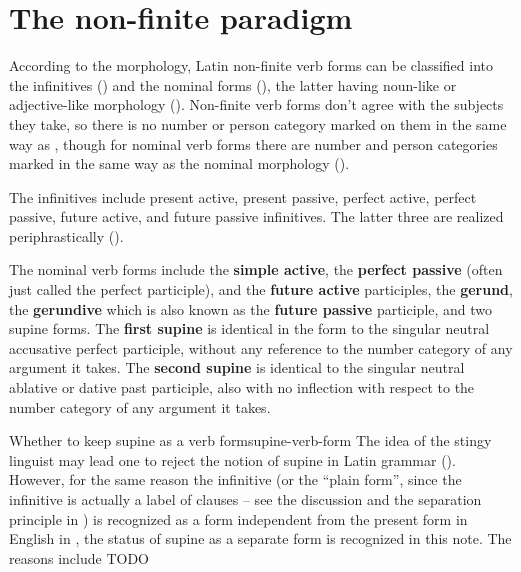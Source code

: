 \documentclass[a4paper, oneside]{report}
\newcommand*{\citepage}[1]{p.~{#1}}
\newcommand*{\concept}[1]{\textbf{#1}}
\begin{document}
\section{The non-finite paradigm}\label{sec:non-finite-abs}

According to the morphology,
Latin non-finite verb forms can be classified into the infinitives ()
and the nominal forms (),
the latter having noun-like or adjective-like morphology ().
Non-finite verb forms don't agree with the subjects they take,
so there is no number or person category marked on them in the same way as ,
though for nominal verb forms there are number and person categories 
marked in the same way as the nominal morphology ().

The infinitives include present active, present passive, perfect active, 
perfect passive, future active, and future passive infinitives.
The latter three are realized periphrastically ().

The nominal verb forms include 
the \concept{simple active}, 
the \concept{perfect passive} (often just called the perfect participle), 
and the \concept{future active} participles,
the \concept{gerund}, 
the \concept{gerundive} which is also known as the \concept{future passive} participle, 
and two supine forms.
The \concept{first supine} is identical in the form to the singular neutral accusative perfect participle,
without any reference to the number category of any argument it takes.
The \concept{second supine} is identical to the singular neutral ablative or dative past participle,
also with no inflection with respect to the number category of any argument it takes.

\begin{infobox}{Whether to keep supine as a verb form}{supine-verb-form}
    The idea of the stingy linguist may lead one to reject the notion of supine in Latin grammar
    ().
    However, for the same reason the infinitive 
    (or the ``plain form'', since the infinitive is actually a label of clauses 
    -- see the discussion and the separation principle in ) 
    is recognized as a form 
    independent from the present form in English in \citet[\citepage{74}]{cgel},
    the status of supine as a separate form is recognized in this note.
    The reasons include TODO
\end{infobox}
\end{document}

